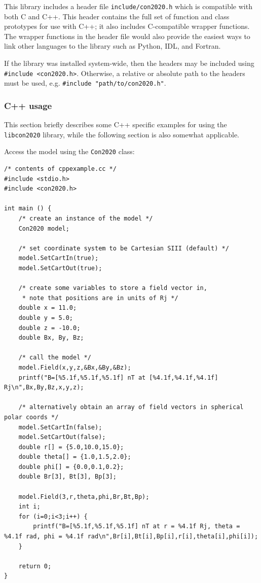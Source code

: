 	This library includes a header file \texttt{include/con2020.h} which is compatible with both C and C++. This header contains the full set of function and class prototypes for use with C++; it also includes C-compatible wrapper functions. The wrapper functions in the header file would also provide the easiest ways to link other languages to the library such as Python, IDL, and Fortran.
	
	If the library was installed system-wide, then the headers may be included using \texttt{\#include <con2020.h>}. Otherwise, a relative or absolute path to the headers must be used, e.g. \texttt{\#include "path/to/con2020.h"}.
	
	\subsubsection{C++ usage}
	
	This section briefly describes some C++ specific examples for using the \texttt{libcon2020} library, while the following section is also somewhat applicable.
	
	Access the model using the \texttt{Con2020} class:
	
	\begin{verbatim}
/* contents of cppexample.cc */
#include <stdio.h>
#include <con2020.h>
	
int main () {
	/* create an instance of the model */
	Con2020 model;
	
	/* set coordinate system to be Cartesian SIII (default) */
	model.SetCartIn(true);
	model.SetCartOut(true);
	
	/* create some variables to store a field vector in,
	 * note that positions are in units of Rj */
	double x = 11.0;
	double y = 5.0;
	double z = -10.0;
	double Bx, By, Bz;
	
	/* call the model */
	model.Field(x,y,z,&Bx,&By,&Bz);
	printf("B=[%5.1f,%5.1f,%5.1f] nT at [%4.1f,%4.1f,%4.1f] Rj\n",Bx,By,Bz,x,y,z);
	
	/* alternatively obtain an array of field vectors in spherical polar coords */
	model.SetCartIn(false);
	model.SetCartOut(false);
	double r[] = {5.0,10.0,15.0};
	double theta[] = {1.0,1.5,2.0};
	double phi[] = {0.0,0.1,0.2};
	double Br[3], Bt[3], Bp[3];
	
	model.Field(3,r,theta,phi,Br,Bt,Bp);
	int i;
	for (i=0;i<3;i++) {
		printf("B=[%5.1f,%5.1f,%5.1f] nT at r = %4.1f Rj, theta = %4.1f rad, phi = %4.1f rad\n",Br[i],Bt[i],Bp[i],r[i],theta[i],phi[i]);
	}
		
	return 0;
}
	\end{verbatim}
	
